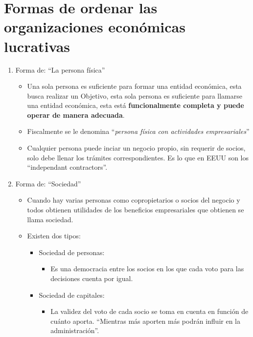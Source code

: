 \documentclass{article}
\begin{document}
\section{Formas de ordenar las organizaciones económicas lucrativas}
\begin{enumerate}
    \item Forma de: ``La persona física''
    \begin{itemize}
        \item Una sola persona es suficiente para formar una entidad económica, esta busca realizar un Objetivo, esta sola persona es suficiente para llamarse una entidad económica, esta está \textbf{funcionalmente completa y puede operar de manera adecuada}.
        \item Fiscalmente se le denomina ``\emph{persona física con actividades empresariales}''
        \item Cualquier persona puede inciar un negocio propio, sin requerir de socios, solo debe llenar los trámites correspondientes. Es lo que en EEUU son los ``independant contractors''.
    \end{itemize}
    
    \item Forma de: ``Sociedad''
    \begin{itemize}
        \item Cuando hay varias personas como copropietarios o socios del negocio y todos obtienen utilidades de los beneficios empresariales que obtienen se llama sociedad.
        \item Existen dos tipos: 
        \begin{itemize}
            \item Sociedad de personas:
            \begin{itemize}
                \item Es una democracia entre los socios en los que cada voto para las decisiones cuenta por igual.
            \end{itemize}

            \item Sociedad de capitales:
            \begin{itemize}
                \item La validez del voto de cada socio se toma en cuenta en función de cuánto aporta. ``Mientras más aporten más podrán influir en la administración''.
            \end{itemize}
        \end{itemize}
    \end{itemize}
\end{enumerate}
\end{document}
